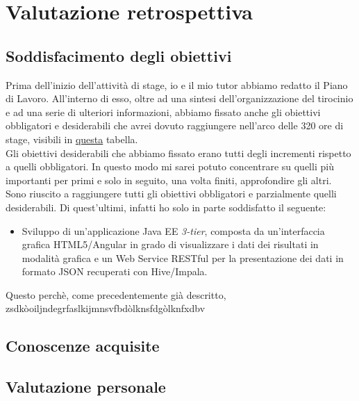 
\chapter{Valutazione retrospettiva}
\label{cap:valutazione-retrospettiva}

\section{Soddisfacimento degli obiettivi}
Prima dell'inizio dell'attività di stage, io e il mio tutor abbiamo redatto il Piano di Lavoro. All'interno di esso, oltre ad una sintesi dell'organizzazione del tirocinio e ad una serie di ulteriori informazioni, abbiamo fissato anche gli obiettivi obbligatori e desiderabili che avrei dovuto raggiungere nell'arco delle 320 ore di stage, visibili in \hyperref[obiettivi_stage]{questa} tabella.\\
Gli obiettivi desiderabili che abbiamo fissato erano tutti degli incrementi rispetto a quelli obbligatori. In questo modo mi sarei potuto concentrare su quelli più importanti per primi e solo in seguito, una volta finiti, approfondire gli altri.\\ 
Sono riuscito a raggiungere tutti gli obiettivi obbligatori e parzialmente quelli desiderabili. Di quest'ultimi, infatti ho solo in parte soddisfatto il seguente:
\begin{itemize}
	\item Sviluppo di un'applicazione Java EE \textit{3-tier}, composta da un'interfaccia grafica HTML5/Angular in grado di visualizzare i dati dei risultati in modalità grafica e un Web Service RESTful per la presentazione dei dati in formato JSON recuperati con Hive/Impala.
\end{itemize}
Questo perchè, come precedentemente già descritto, zsdkòoiljndegrfaslkijmnsvfbdòlknsfdgòlknfxdbv


\section{Conoscenze acquisite}


\section{Valutazione personale}